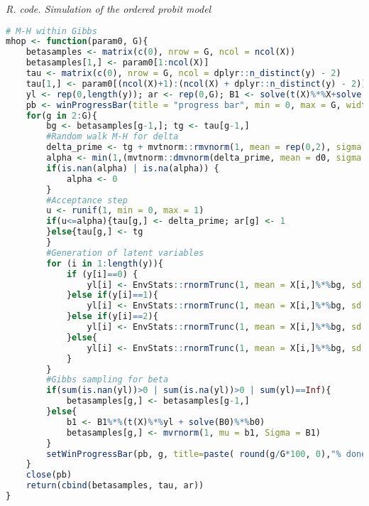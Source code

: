 \begin{enumerate}[leftmargin=*]
\begin{tcolorbox}[enhanced,width=4.67in,center upper,
	fontupper=\large\bfseries,drop shadow southwest,sharp corners]
	\textit{R. code. Simulation of the ordered probit model}
	\begin{VF}
		\begin{lstlisting}[language=R]
# M-H within Gibbs
mhop <- function(param0, G){
	betasamples <- matrix(c(0), nrow = G, ncol = ncol(X))
	betasamples[1,] <- param0[1:ncol(X)]
	tau <- matrix(c(0), nrow = G, ncol = dplyr::n_distinct(y) - 2)
	tau[1,] <- param0[(ncol(X)+1):(ncol(X) + dplyr::n_distinct(y) - 2)]
	yl <- rep(0,length(y)); ar <- rep(0,G); B1 <- solve(t(X)%*%X+solve(B0))
	pb <- winProgressBar(title = "progress bar", min = 0, max = G, width = 300)
	for(g in 2:G){
		bg <- betasamples[g-1,]; tg <- tau[g-1,]
		#Random walk M-H for delta
		delta_prime <- tg + mvtnorm::rmvnorm(1, mean = rep(0,2), sigma = VarProp)
		alpha <- min(1,(mvtnorm::dmvnorm(delta_prime, mean = d0, sigma = D0)*exp(-LogLikOP(c(bg, delta_prime)) + LogLikOP(c(bg, tg))))/mvtnorm::dmvnorm(tg, mean = d0, sigma = D0))
		if(is.nan(alpha) | is.na(alpha)) {
			alpha <- 0
		}
		#Acceptance step
		u <- runif(1, min = 0, max = 1)
		if(u<=alpha){tau[g,] <- delta_prime; ar[g] <- 1
		}else{tau[g,] <- tg
		}
		#Generation of latent variables
		for (i in 1:length(y)){
			if (y[i]==0) {
				yl[i] <- EnvStats::rnormTrunc(1, mean = X[i,]%*%bg, sd = 1, max = 0)
			}else if(y[i]==1){
				yl[i] <- EnvStats::rnormTrunc(1, mean = X[i,]%*%bg, sd = 1, min = 0, max = exp(tau[g,1]))
			}else if(y[i]==2){
				yl[i] <- EnvStats::rnormTrunc(1, mean = X[i,]%*%bg, sd = 1, min = exp(tau[g,1]), max = exp(tau[g,2])+exp(tau[g,1]))
			}else{
				yl[i] <- EnvStats::rnormTrunc(1, mean = X[i,]%*%bg, sd = 1, min = exp(tau[g,2])+exp(tau[g,1]))
			}
		}
		#Gibbs sampling for beta
		if(sum(is.nan(yl))>0 | sum(is.na(yl))>0 | sum(yl)==Inf){
			betasamples[g,] <- betasamples[g-1,]
		}else{
			b1 <- B1%*%(t(X)%*%yl + solve(B0)%*%b0)
			betasamples[g,] <- mvrnorm(1, mu = b1, Sigma = B1)
		}
		setWinProgressBar(pb, g, title=paste( round(g/G*100, 0),"% done"))
	}
	close(pb)
	return(cbind(betasamples, tau, ar))
}
\end{lstlisting}
	\end{VF}
\end{tcolorbox} 


\end{enumerate}
